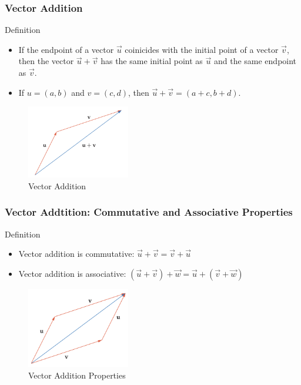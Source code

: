 \documentclass{beamer}
\begin{document}
\begin{frame}
    \frametitle{Vector Addition}
    \begin{block}{Definition}
       \begin{itemize}
        \item If the endpoint of a vector \(\vec u\) coinicides with the initial point of a vector \(\vec v\), then the vector \(\vec u + \vec v\) has the same initial point as \(\vec u\) and the same endpoint as \(\vec v\).
        \item If \(u = (a,b)\) and \(v = (c,d)\), then \(\vec u + \vec v = (a+c, b+d)\).
       \end{itemize}
    \end{block}
    \begin{figure}
        \centering
        \includegraphics[width=0.4\textwidth]{vector3.png}
        \caption{Vector Addition}
        \label{fig:vector_addition}
    \end{figure}
\end{frame} 

\begin{frame}
    \frametitle{Vector Addtition: Commutative and Associative Properties}
    \begin{block}{Definition}
        \begin{itemize}
            \item Vector addition is commutative: \(\vec u + \vec v = \vec v + \vec u\)
            \item Vector addition is associative: \((\vec u + \vec v) + \vec w = \vec u + (\vec v + \vec w)\)
        \end{itemize}
    \end{block}
    \begin{figure}
        \centering
        \includegraphics[width=0.4\textwidth]{vector4.png}
        \caption{Vector Addition Properties}
        \label{fig:vector_subtraction}
    \end{figure}

\end{frame}
\end{document}
